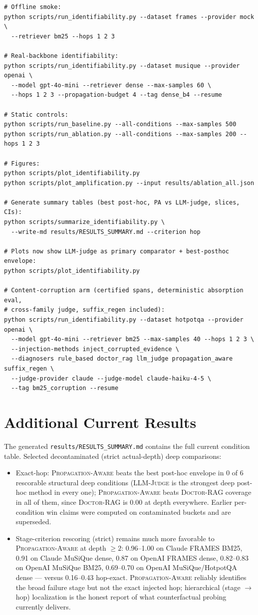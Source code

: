\documentclass[11pt]{article}
\newcommand{\dr}{\textnormal{\textsc{Doctor-RAG}}}
\newcommand{\pa}{\textnormal{\textsc{Propagation-Aware}}}
\newcommand{\lj}{\textnormal{\textsc{LLM-Judge}}}
\begin{document}
\begin{verbatim}
# Offline smoke:
python scripts/run_identifiability.py --dataset frames --provider mock \
  --retriever bm25 --hops 1 2 3

# Real-backbone identifiability:
python scripts/run_identifiability.py --dataset musique --provider openai \
  --model gpt-4o-mini --retriever dense --max-samples 60 \
  --hops 1 2 3 --propagation-budget 4 --tag dense_b4 --resume

# Static controls:
python scripts/run_baseline.py --all-conditions --max-samples 500
python scripts/run_ablation.py --all-conditions --max-samples 200 --hops 1 2 3

# Figures:
python scripts/plot_identifiability.py
python scripts/plot_amplification.py --input results/ablation_all.json

# Generate summary tables (best post-hoc, PA vs LLM-judge, slices, CIs):
python scripts/summarize_identifiability.py \
  --write-md results/RESULTS_SUMMARY.md --criterion hop

# Plots now show LLM-judge as primary comparator + best-posthoc envelope:
python scripts/plot_identifiability.py

# Content-corruption arm (certified spans, deterministic absorption eval,
# cross-family judge, suffix_regen included):
python scripts/run_identifiability.py --dataset hotpotqa --provider openai \
  --model gpt-4o-mini --retriever bm25 --max-samples 40 --hops 1 2 3 \
  --injection-methods inject_corrupted_evidence \
  --diagnosers rule_based doctor_rag llm_judge propagation_aware suffix_regen \
  --judge-provider claude --judge-model claude-haiku-4-5 \
  --tag bm25_corruption --resume
\end{verbatim}

\section{Additional Current Results}
\label{app:results}

The generated \texttt{results/RESULTS\_SUMMARY.md} contains the full current
condition table.  Selected decontaminated (strict actual-depth) deep
comparisons:
\begin{itemize}[leftmargin=*]
  \item Exact-hop: \pa{} beats the best post-hoc envelope in 0 of 6
  rescorable structural deep conditions (\lj{} is the strongest deep post-hoc
  method in every one); \pa{} beats \dr{} coverage in all of them, since \dr{}
  is 0.00 at depth everywhere.  Earlier per-condition win claims were computed
  on contaminated buckets and are superseded.
  \item Stage-criterion rescoring (strict) remains much more favorable to
  \pa{} at depth $\geq 2$: 0.96--1.00 on Claude FRAMES BM25, 0.91 on Claude
  MuSiQue dense, 0.87 on OpenAI FRAMES dense, 0.82--0.83 on OpenAI MuSiQue
  BM25, 0.69--0.70 on OpenAI MuSiQue/HotpotQA dense --- versus 0.16--0.43
  hop-exact.  \pa{} reliably identifies the broad failure stage but not the
  exact injected hop; hierarchical (stage $\rightarrow$ hop) localization is
  the honest report of what counterfactual probing currently delivers.
\end{itemize}
\end{document}
